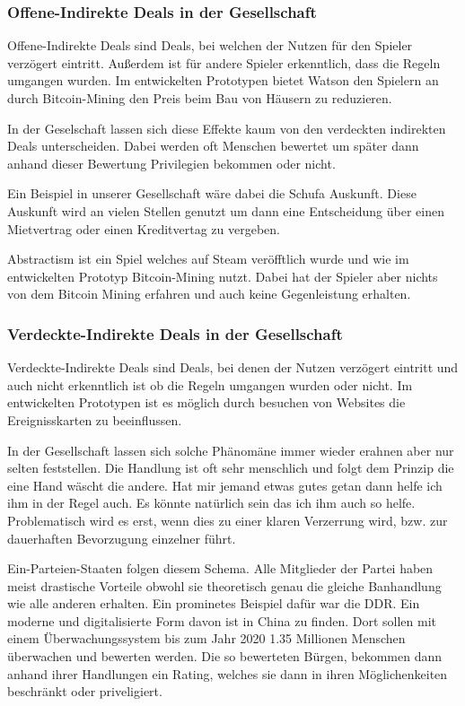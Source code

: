 \documentclass[german]{cgspaper} %
\begin{document}
\subsubsection{Offene-Indirekte Deals in der Gesellschaft}

Offene-Indirekte Deals sind Deals, bei welchen der Nutzen für den Spieler verzögert eintritt.
Außerdem ist für andere Spieler erkenntlich, dass die Regeln umgangen wurden.
Im entwickelten Prototypen bietet Watson den Spielern an durch Bitcoin-Mining den Preis beim Bau von Häusern zu reduzieren.

In der Geselschaft lassen sich diese Effekte kaum von den verdeckten indirekten Deals unterscheiden.
Dabei werden oft Menschen bewertet um später dann anhand dieser Bewertung Privilegien bekommen oder nicht.

Ein Beispiel in unserer Gesellschaft wäre dabei die Schufa Auskunft.
Diese Auskunft wird an vielen Stellen genutzt um dann eine Entscheidung über einen Mietvertrag oder einen Kreditvertag zu vergeben. 

Abstractism ist ein Spiel welches auf Steam veröfftlich wurde und wie im entwickelten Prototyp Bitcoin-Mining nutzt. \cite{Abstractism2018}
Dabei hat der Spieler aber nichts von dem Bitcoin Mining erfahren und auch keine Gegenleistung erhalten.

\subsubsection{Verdeckte-Indirekte Deals in der Gesellschaft}

Verdeckte-Indirekte Deals sind Deals, bei denen der Nutzen verzögert eintritt und auch nicht erkenntlich ist ob die Regeln umgangen wurden oder nicht.
Im entwickelten Prototypen ist es möglich durch besuchen von Websites die Ereignisskarten zu beeinflussen.

In der Gesellschaft lassen sich solche Phänomäne immer wieder erahnen aber nur selten feststellen.
Die Handlung ist oft sehr menschlich und folgt dem Prinzip die eine Hand wäscht die andere.
Hat mir jemand etwas gutes getan dann helfe ich ihm in der Regel auch.
Es könnte natürlich sein das ich ihm auch so helfe.
Problematisch wird es erst, wenn dies zu einer klaren Verzerrung wird, bzw. zur dauerhaften Bevorzugung einzelner führt.

Ein-Parteien-Staaten folgen diesem Schema.
Alle Mitglieder der Partei haben meist drastische Vorteile obwohl sie theoretisch genau die gleiche Banhandlung wie alle anderen erhalten.
Ein prominetes Beispiel dafür war die DDR.
Ein moderne und digitalisierte Form davon ist in China zu finden.
Dort sollen mit einem Überwachungssystem bis zum Jahr 2020 1.35 Millionen Menschen überwachen und bewerten werden. \cite{China2018}
Die so bewerteten Bürgen, bekommen dann anhand ihrer Handlungen ein Rating, welches sie dann in ihren Möglichenkeiten beschränkt oder priveligiert.
\end{document}
